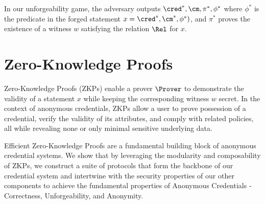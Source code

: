 In our unforgeability game, the adversary outputs $\cred^*, \cm, \pi^*, \phi^*$ where $\phi^*$ is the predicate in the forged statement $x = \cred^*, \cm^*, \phi^*)$, and $\pi^*$ proves the existence of a witness $w$ satisfying the relation $\Rel$ for $x$.





% 
% 










%  
% 
% 
\newpage
\section{Zero-Knowledge Proofs}

Zero-Knowledge Proofs (ZKPs) enable a prover $\Prover$ to demonstrate the validity of a statement $x$ while keeping the corresponding witness $w$ secret. In the context of anonymous credentials, ZKPs allow a user to prove possession of a credential, verify the validity of its attributes, and comply with related policies, all while revealing none or only minimal sensitive underlying data.

Efficient Zero-Knowledge Proofs are a fundamental building block of anonymous credential systems. We show that by leveraging the modularity and composability of ZKPs, we construct a suite of protocols that form the backbone of our credential system and intertwine with the security properties of our other components to achieve the fundamental properties of Anonymous Credentials - Correctness, Unforgeability, and Anonymity.

